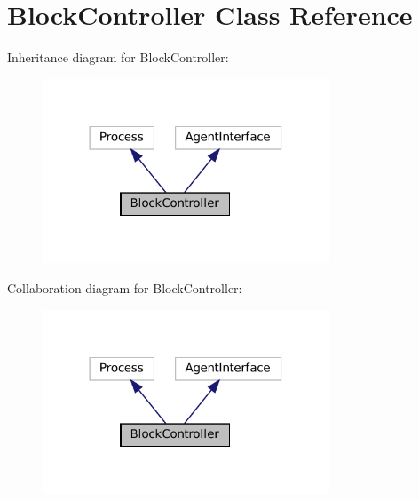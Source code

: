 \hypertarget{classBlockController}{}\section{Block\+Controller Class Reference}
\label{classBlockController}


Inheritance diagram for Block\+Controller\+:
\nopagebreak
\begin{figure}[H]
\begin{center}
\leavevmode
\includegraphics[width=242pt]{classBlockController__inherit__graph}
\end{center}
\end{figure}


Collaboration diagram for Block\+Controller\+:
\nopagebreak
\begin{figure}[H]
\begin{center}
\leavevmode
\includegraphics[width=242pt]{classBlockController__coll__graph}
\end{center}
\end{figure}
